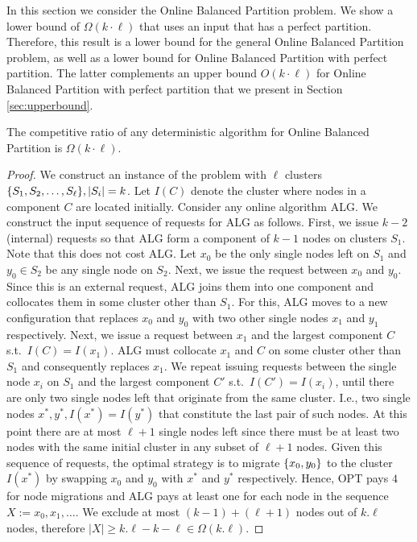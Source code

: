 
In this section we consider the Online Balanced Partition problem.
We show a lower bound of $\Omega(k \cdot \ell)$ that uses an input that has a perfect partition.
Therefore, this result is a lower bound for the general Online Balanced Partition problem, as well as a lower bound for Online Balanced Partition with perfect partition.
The latter complements an upper bound $O(k \cdot \ell)$ for Online Balanced Partition with perfect partition that we present in Section \ref{sec:upperbound}.

\begin{theorem}
  The competitive ratio of any deterministic algorithm for Online Balanced Partition is $\Omega(k\cdot \ell)$.
\end{theorem}

\begin{proof}
We construct an instance of the problem with $\ell$ clusters 
$\{ S_1, S_2,\dots , S_{\ell}\}, |S_i|  = k$.
Let $I(C)$ denote the cluster where nodes in a component $C$ are located initially.
Consider any online algorithm ALG.
We construct the input sequence of requests for ALG as follows.
First,
we issue $k-2$ (internal) requests so that ALG form a component of $k-1$
nodes on clusters $S_1$.
Note that this does not cost ALG.
Let $x_0$  be the only single nodes left on $S_1$ and  $y_0 \in S_2$ be any single node on $S_2$.
Next,
we issue the request between $x_0$ and $y_0$.
Since this is an external request,
ALG joins them into one component and collocates them in some cluster other than $S_1$.
For this,
ALG moves to a new configuration that replaces $x_0$ and $y_0$ with two other single nodes $x_1$ and $y_1$ respectively.
Next,
we issue a request between $x_1$ and the largest component $C$ s.t.~$I(C) = I(x_1)$.
ALG must collocate $x_1$ and $C$ on some cluster other than $S_1$ and
consequently replaces $x_1$.
We repeat issuing requests between the single node $x_i$ on $S_1$ and the largest component $C'$ s.t.~$I(C')=I(x_i)$,
 until there are only two single nodes left that  originate from the same cluster.
I.e.,
two single nodes $x^*, y^*,I(x^*) = I(y^*)$
that constitute the last pair of such nodes.
At this point there are at most $\ell+1$ single nodes left
since there must be at least two nodes with the same initial cluster in any subset of $\ell+1$
nodes.
Given this sequence of requests,
the optimal strategy is to migrate $\{x_0,y_0\}$ to the cluster $I(x^*)$ by
 swapping $x_0$ and $y_0$ with $x^*$ and $y^*$ respectively.
Hence,
OPT pays $4$ for node migrations and
ALG pays at least one for each node in the sequence $X := x_0, x_1,\dots$.
We exclude at most $(k-1) + ( \ell+1)$ nodes out of $k.\ell$ nodes,
therefore $|X| \geq k.\ell - k - \ell \in \Omega(k.\ell)$.
\end{proof}

